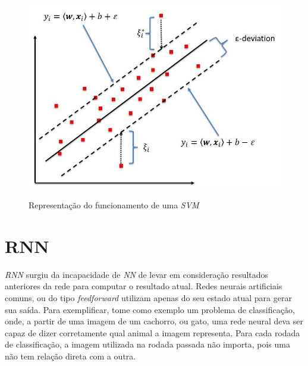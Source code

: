 \begin{figure}[htbp]
    \centering
    \includegraphics[scale=1.0]{monography/img/svr_example.png}
    \label{figure:support_vector_machine}
    \caption[Representação do funcionamento de uma \textit{\acrshort{SVM}}]{Representação do funcionamento de uma \textit{\acrshort{SVM}}\footnotemark}
\end{figure}



\section{\acrfull{RNN}}




\textit{\acrshort{RNN}} surgiu da incapacidade de \textit{\acrfull{NN}} de levar em consideração resultados anteriores da rede para computar o resultado atual. Redes neurais artificiais comuns, ou do tipo \textit{feedforward} utilizam apenas do seu estado atual para gerar sua saída. Para exemplificar, tome como exemplo um problema de classificação, onde, a partir de uma imagem de um cachorro, ou gato, uma rede neural deva ser capaz de dizer corretamente qual animal a imagem representa. Para cada rodada de classificação, a imagem utilizada na rodada passada não importa, pois uma não tem relação direta com a outra. 


